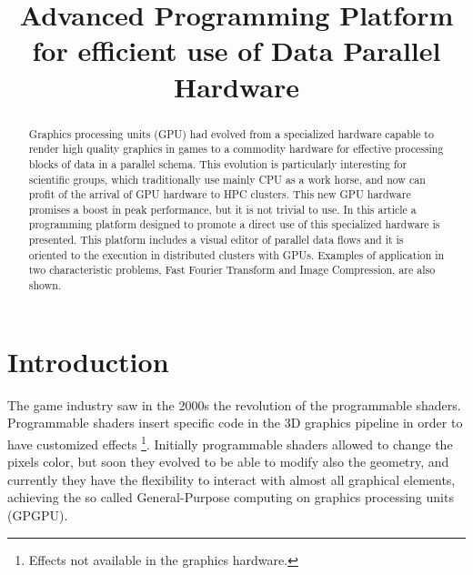 \documentclass[conference]{IEEEtran}
\begin{document}
\title{Advanced Programming Platform for efficient use of Data Parallel Hardware}

\author{
}









\maketitle


\begin{abstract}
Graphics processing units (GPU) had evolved from a specialized hardware capable
to render high quality graphics in games to a commodity hardware for effective
processing blocks of data in a parallel schema. This evolution is particularly
interesting for scientific groups, which traditionally use mainly CPU as a work
horse, and now can profit of the arrival of GPU hardware to HPC clusters.  This
new GPU hardware promises a boost in peak performance, but it is not trivial to
use.  In this article a programming platform designed to promote a direct use of
this specialized hardware is presented.  This platform includes a visual editor
of parallel data flows and it is oriented to the execution in distributed
clusters with GPUs.  Examples of application in two characteristic problems,
Fast Fourier Transform and Image Compression, are also shown.
\end{abstract}




\IEEEpeerreviewmaketitle


\section{Introduction}




The game industry saw in the 2000s the revolution of the programmable
shaders. Programmable shaders insert specific code in the 3D graphics pipeline
in order to have customized effects \footnote{Effects not available in the
  graphics hardware.}.  Initially programmable shaders allowed to change the
pixels color, but soon they evolved to be able to modify also the geometry, and
currently they have the flexibility to interact with almost all graphical
elements, achieving the so called General-Purpose computing on graphics
processing units (GPGPU).
\end{document}
